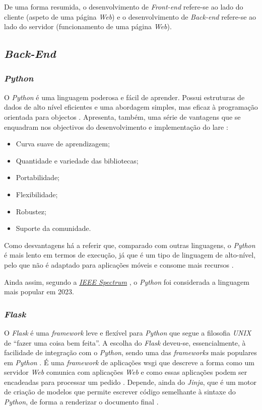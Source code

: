 De uma forma resumida, o desenvolvimento de \textit{Front-end} refere-se ao lado do cliente (aspeto de uma página \textit{Web}) e o desenvolvimento de \textit{Back-end} refere-se ao lado do servidor (funcionamento de uma página \textit{Web}).

\subsection{\textit{Back-End}}
\label{sec:back-end}
\subsubsection{\textit{Python}}
O \textit{Python} é uma linguagem poderosa e fácil de aprender. Possui estruturas de dados de alto nível eficientes e uma abordagem simples, mas eficaz à programação orientada para objectos \cite{ThePython}. Apresenta, também, uma série de vantagens que se enquadram nos objectivos do desenvolvimento e implementação do \acrshort{lare} \cite{pythonvantagens}:
\begin{itemize}
    \item Curva suave de aprendizagem;
    \item Quantidade e variedade das bibliotecas;
    \item Portabilidade;
    \item Flexibilidade;
    \item Robustez;
    \item Suporte da comunidade.
\end{itemize}

Como desvantagens há a referir que, comparado com outras linguagens, o \textit{Python} é mais lento em termos de execução, já que é um tipo de linguagem de alto-nível, pelo que não é adaptado para aplicações móveis e consome mais recursos \cite{pythonvantagens} \cite{5MainDispython}.

Ainda assim, segundo a \textit{\href{https://spectrum.ieee.org/the-top-programming-languages-2023}{\textit{IEEE Spectrum}}} \cite{ieeespectrum}, o \textit{Python} foi considerada a linguagem mais popular em 2023.

\subsubsection{\textit{Flask}}
O \textit{Flask} é uma \textit{framework} leve e flexível para \textit{Python} que segue a filosofia \textit{UNIX} de ``fazer uma coisa bem feita''. A escolha do \textit{Flask} deveu-se, essencialmente, à facilidade de integração com o \textit{Python}, sendo uma das \textit{frameworks} mais populares em \textit{Python} \cite{Flask}. É uma \textit{framework} de aplicações \acrfull{wsgi} que descreve a forma como um servidor \textit{Web} comunica com aplicações \textit{Web} e como essas aplicações podem ser encadeadas para processar um pedido \cite{wsgi}. Depende, ainda do  \textit{Jinja}, que é um motor de criação de modelos que permite escrever código semelhante à sintaxe do \textit{Python}, de forma a renderizar o documento final \cite{Jinja}.

